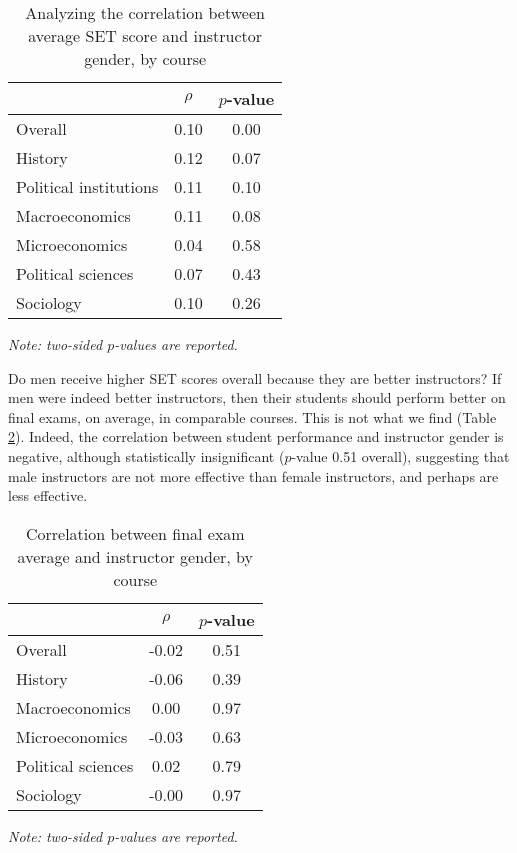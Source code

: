 \documentclass[12pt]{article}
\begin{document}
\begin{table}[htbp]
  \centering
  \footnotesize 
  \caption{Analyzing the correlation between average SET score and instructor gender, by course}
    \begin{tabular}{lcc}
    \toprule 
                          & $\rho$  & $p$-value     \\
   \midrule
    Overall &                 0.10       & 0.00     \\
    History &                 0.12       & 0.07     \\
    Political institutions &  0.11       & 0.10     \\
    Macroeconomics &          0.11       & 0.08     \\
    Microeconomics &          0.04       & 0.58     \\
    Political sciences &      0.07       & 0.43     \\
    Sociology &               0.10       & 0.26     \\
    \bottomrule
    \end{tabular}%
 \label{tab:instructorgender}%
  
  \textit{Note: two-sided $p$-values are reported.}
\end{table}%
\normalsize


Do men receive higher SET scores overall because they are better instructors? 
If men were indeed better instructors, then their students should perform better on final exams, on average,
in comparable courses. 
This is not what we find (Table \ref{tab:genderfinal}). 
Indeed, the correlation between student performance and instructor gender is negative, although statistically insignificant ($p$-value 0.51 overall), suggesting that male instructors are not more effective
than female instructors, and perhaps are less effective. 


\begin{table}[htbp]
  \centering
  \footnotesize 
  \caption{Correlation between final exam average and instructor gender, by course}
    \begin{tabular}{lcc}
    \toprule 
                     & $\rho$  & $p$-value    \\
   \midrule
    Overall &            -0.02       & 0.51      \\
    History &            -0.06       & 0.39      \\
    Macroeconomics &      0.00       & 0.97      \\
    Microeconomics &     -0.03       & 0.63      \\
    Political sciences &  0.02       & 0.79      \\
    Sociology &          -0.00       & 0.97      \\
    \bottomrule
    \end{tabular}%
 \label{tab:genderfinal}%
 
  \textit{Note: two-sided $p$-values are reported.}
\end{table}%
\normalsize
\end{document}
